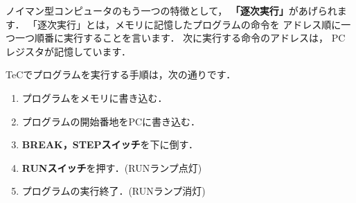 ノイマン型コンピュータのもう一つの特徴として，
{\bf 「逐次実行」}があげられます．
「逐次実行」とは，メモリに記憶したプログラムの命令を
アドレス順に一つ一つ順番に実行することを言います．
次に実行する命令のアドレスは，
PCレジスタが記憶しています．

TeCでプログラムを実行する手順は，次の通りです．

\begin{enumerate}
\item プログラムをメモリに書き込む．
\item プログラムの開始番地をPCに書き込む．
\item {\bf BREAK，STEPスイッチ}を下に倒す．
\item {\bf RUNスイッチ}を押す．(RUNランプ点灯)
\item プログラムの実行終了．(RUNランプ消灯)
\end{enumerate}


